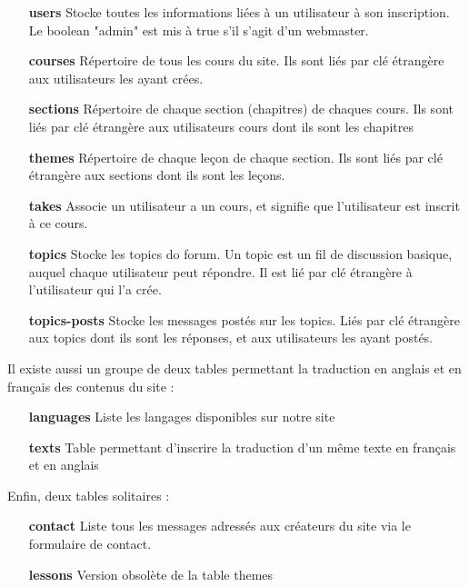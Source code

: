 \documentclass[a4paper,10pt]{article}
\begin{document}
\begin{itemize}
\item[\textbf{users}] Stocke toutes les informations liées à un utilisateur à son inscription. Le boolean "admin" est mis à true s'il s'agit d'un webmaster.
\item[\textbf{courses}] Répertoire de tous les cours du site. Ils sont liés par clé étrangère aux utilisateurs les ayant crées.
\item[\textbf{sections}] Répertoire de chaque section (chapitres) de chaques cours. Ils sont liés par clé étrangère aux utilisateurs cours dont ils sont les chapitres
\item[\textbf{themes}] Répertoire de chaque leçon de chaque section. Ils sont liés par clé étrangère aux sections dont ils sont les leçons.
\item[\textbf{takes}] Associe un utilisateur a un cours, et signifie que l'utilisateur est inscrit à ce cours.
\item[\textbf{topics}] Stocke les topics do forum. Un topic est un fil de discussion basique, auquel chaque utilisateur peut répondre. Il est lié par clé étrangère à l'utilisateur qui l'a crée.
\item[\textbf{topics-posts}] Stocke les messages postés sur les topics. Liés par clé étrangère aux topics dont ils sont les réponses, et aux utilisateurs les ayant postés.
\end{itemize}

Il existe aussi un groupe de deux tables permettant la traduction en anglais et en français des contenus du site : 

\begin{itemize}
\item[\textbf{languages}] Liste les langages disponibles sur notre site
\item[\textbf{texts}] Table permettant d'inscrire la traduction d'un même texte en français et en anglais
\end{itemize}

Enfin, deux tables solitaires :

\begin{itemize}
\item[\textbf{contact}] Liste tous les messages adressés aux créateurs du site via le formulaire de contact.
\item[\textbf{lessons}] Version obsolète de la table themes
\end{itemize}
\newpage
\end{document}

